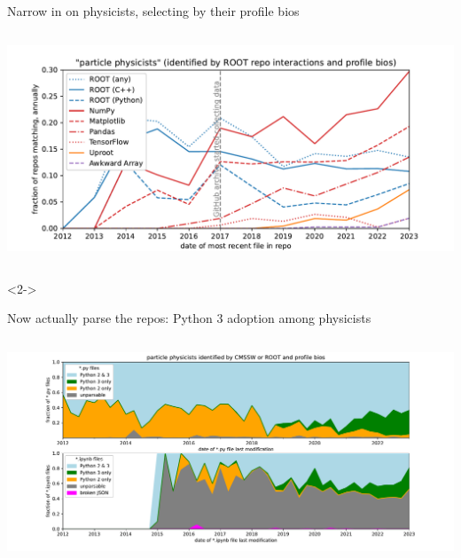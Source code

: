 \documentclass[aspectratio=169]{beamer}
\begin{document}
\begin{frame}{Narrow in on physicists, selecting by their profile bios}
\begin{columns}
\hspace{-0.25 cm}\includegraphics[width=\linewidth]{analysis/github-package-rootseed-tight-fraction.pdf}
\end{columns}

\begin{uncoverenv}<2->
\vspace{-4.3 cm}
\mbox{ } \hfill {} \hfill \mbox{ }
\vspace{4.3 cm}
\end{uncoverenv}
\end{frame}

\begin{frame}{Now actually parse the repos: Python 3 adoption among physicists}
\vspace{0.5 cm}
\begin{columns}
\includegraphics[width=\linewidth]{analysis/github-python-2-3-fraction.pdf}
\end{columns}
\end{frame}
\end{document}
